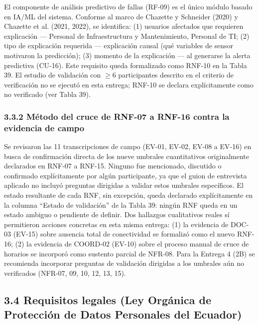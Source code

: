 
El componente de análisis predictivo de fallas (RF-09) es el único módulo basado en IA/ML del sistema. Conforme al marco de Chazette y Schneider (2020) y Chazette et al. (2021, 2022), se identifica: (1) usuarios afectados que requieren explicación --- Personal de Infraestructura y Mantenimiento, Personal de TI; (2) tipo de explicación requerida --- explicación causal (qué variables de sensor motivaron la predicción); (3) momento de la explicación --- al generarse la alerta predictiva (CU-16). Este requisito queda formalizado como RNF-10 en la Tabla 39. El estudio de validación con $\geq$6 participantes descrito en el criterio de verificación no se ejecutó en esta entrega; RNF-10 se declara explícitamente como no verificado (ver Tabla 39).


\subsubsection*{3.3.2 Método del cruce de RNF-07 a RNF-16 contra la evidencia de campo}


Se revisaron las 11 transcripciones de campo (EV-01, EV-02, EV-08 a EV-16) en busca de confirmación directa de los nueve umbrales cuantitativos originalmente declarados en RNF-07 a RNF-15. Ninguno fue mencionado, discutido o confirmado explícitamente por algún participante, ya que el guion de entrevista aplicado no incluyó preguntas dirigidas a validar estos umbrales específicos. El estado resultante de cada RNF, sin excepción, queda declarado explícitamente en la columna ``Estado de validación'' de la Tabla 39: ningún RNF queda en un estado ambiguo o pendiente de definir. Dos hallazgos cualitativos reales sí permitieron acciones concretas en esta misma entrega: (1) la evidencia de DOC-03 (EV-15) sobre ausencia total de conectividad se formalizó como el nuevo RNF-16; (2) la evidencia de COORD-02 (EV-10) sobre el proceso manual de cruce de horarios se incorporó como sustento parcial de NFR-08. Para la Entrega 4 (2B) se recomienda incorporar preguntas de validación dirigidas a los umbrales aún no verificados (NFR-07, 09, 10, 12, 13, 15).

\subsection*{3.4 Requisitos legales (Ley Orgánica de Protección de Datos Personales del Ecuador)}

